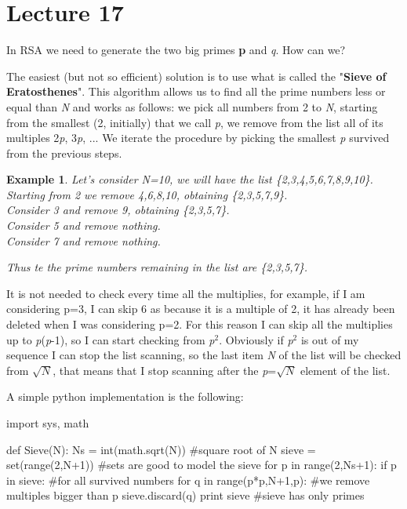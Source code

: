 \documentclass[a4paper, 12pt]{report}
\newtheorem{example}{\textbf{Example}}
\begin{document}
\chapter*{Lecture 17}
In RSA we need to generate the two big primes \textbf{p} and \textit{q}. How can we?

The easiest (but not so efficient) solution is to use what is called the "\textbf{Sieve of Eratosthenes}". This algorithm allows us to find all the prime numbers less or equal than \textit{N} and works as follows: we pick all numbers from 2 to \textit{N}, starting from the smallest (2, initially) that we call \textit{p}, we remove from the list all of its multiples 2\textit{p}, 3\textit{p}, ... We iterate the procedure by picking the smallest \textit{p} survived from the previous steps.

\begin{example}
	Let's consider N=10, we will have the list \{2,3,4,5,6,7,8,9,10\}.\\
	Starting from 2 we remove 4,6,8,10, obtaining \{2,3,5,7,9\}.\\
	Consider 3 and remove 9, obtaining \{2,3,5,7\}.\\
	Consider 5 and remove nothing.\\
	Consider 7 and remove nothing.
	
	Thus te the prime numbers remaining in the list are \{2,3,5,7\}.
\end{example} 

It is not needed to check every time all the multiplies, for example, if I am considering p=3, I can skip 6 as because it is a multiple of 2, it has already been deleted when I was considering p=2. For this reason I can skip all the multiplies up to \textit{p}(\textit{p}-1), so I can start checking from \textit{p}$^2$. Obviously if \textit{p}$^2$ is out of my sequence I can stop the list scanning, so the last item \textit{N} of the list will be checked from $\sqrt{N}$, that means that I stop scanning after the \textit{p}=$\sqrt{N}$ element of the list. 

A simple python implementation is the following:
\begin{python}
import sys, math

def Sieve(N):
	Ns = int(math.sqrt(N))						#square root of N
	sieve = set(range(2,N+1))					#sets are good to model the sieve
	for p in range(2,Ns+1):
		if p in sieve: 									#for all survived numbers
			for q in range(p*p,N+1,p): 		#we remove multiples bigger than p
				sieve.discard(q)
	print sieve												#sieve has only primes
\end{python}
\end{document}
